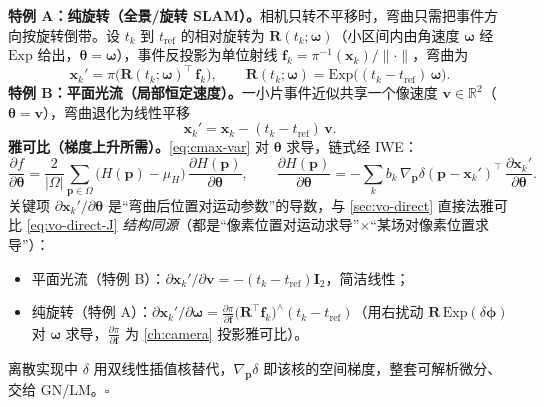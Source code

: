 \begin{derivation}
\label{thm:cmax-jac}
\textbf{特例 A：纯旋转（全景/旋转 SLAM）。}\;相机只转不平移时，弯曲只需把事件方向按旋转倒带。设 $t_k$ 到 $t_{\mathrm{ref}}$ 的相对旋转为 $\mathbf R(t_k;\boldsymbol\omega)$（小区间内由角速度 $\boldsymbol\omega$ 经 $\mathrm{Exp}$ 给出，$\boldsymbol\theta=\boldsymbol\omega$），事件反投影为单位射线 $\mathbf f_k=\pi^{-1}(\mathbf x_k)/\|\cdot\|$，弯曲为
\begin{equation}
  \mathbf x_k'=\pi\big(\mathbf R(t_k;\boldsymbol\omega)^\top\,\mathbf f_k\big),\qquad
  \mathbf R(t_k;\boldsymbol\omega)=\mathrm{Exp}\big((t_k-t_{\mathrm{ref}})\,\boldsymbol\omega\big).
  \label{eq:cmax-rot-warp}
\end{equation}
\textbf{特例 B：平面光流（局部恒定速度）。}\;一小片事件近似共享一个像速度 $\mathbf v\in\mathbb R^2$（$\boldsymbol\theta=\mathbf v$），弯曲退化为线性平移
\begin{equation}
  \mathbf x_k'=\mathbf x_k-(t_k-t_{\mathrm{ref}})\,\mathbf v.
  \label{eq:cmax-flow-warp}
\end{equation}
\textbf{雅可比（梯度上升所需）。}\;\cref{eq:cmax-var} 对 $\boldsymbol\theta$ 求导，链式经 IWE：
\begin{equation}
  \frac{\partial f}{\partial\boldsymbol\theta}
  =\frac{2}{|\Omega|}\sum_{\mathbf p\in\Omega}\big(H(\mathbf p)-\mu_H\big)\,
  \frac{\partial H(\mathbf p)}{\partial\boldsymbol\theta},\qquad
  \frac{\partial H(\mathbf p)}{\partial\boldsymbol\theta}
  =-\sum_{k} b_k\,\nabla_{\!\mathbf p}\delta(\mathbf p-\mathbf x_k')^\top\,
  \frac{\partial\mathbf x_k'}{\partial\boldsymbol\theta}.
  \label{eq:cmax-grad}
\end{equation}
关键项 $\partial\mathbf x_k'/\partial\boldsymbol\theta$ 是“弯曲后位置对运动参数”的导数，与 \cref{sec:vo-direct} 直接法雅可比 \cref{eq:vo-direct-J} \emph{结构同源}（都是“像素位置对运动求导”$\times$“某场对像素位置求导”）：
\begin{itemize}
  \item 平面光流（特例 B）：$\partial\mathbf x_k'/\partial\mathbf v=-(t_k-t_{\mathrm{ref}})\mathbf I_2$，简洁线性；
  \item 纯旋转（特例 A）：$\partial\mathbf x_k'/\partial\boldsymbol\omega=\frac{\partial\pi}{\partial\mathbf f}\big(\mathbf R^\top\mathbf f_k\big)^\wedge(t_k-t_{\mathrm{ref}})$（用右扰动 $\mathbf R\,\mathrm{Exp}(\delta\boldsymbol\phi)$ 对 $\boldsymbol\omega$ 求导，$\frac{\partial\pi}{\partial\mathbf f}$ 为 \cref{ch:camera} 投影雅可比）。
\end{itemize}
离散实现中 $\delta$ 用双线性插值核替代，$\nabla_{\!\mathbf p}\delta$ 即该核的空间梯度，整套可解析微分、交给 GN/LM。\hfill$\square$
\end{derivation}

